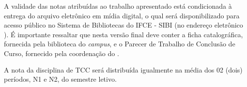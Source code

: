 A validade das notas atribuídas ao trabalho apresentado está condicionada à entrega %
do arquivo eletrônico em mídia digital, o qual será disponibilizado para acesso público no Sistema de Bibliotecas do IFCE - SIBI (no endereço eletrônico ). É importante ressaltar que nesta versão final deve conter a ficha catalográfica, fornecida pela biblioteca do \textit{campus}, e o Parecer de Trabalho de Conclusão de Curso, fornecido pela coordenação do \NOMECURSO.

A nota da disciplina de TCC será distribuída igualmente na média dos 02 (dois) períodos, N1 e N2, do semestre letivo.




